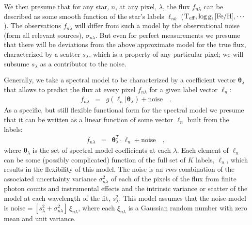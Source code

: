 \documentclass[12pt, preprint]{aastex}
\newcommand{\set}[1]{\bm{#1}}
\newcommand{\starlabel}{\ell}
\newcommand{\starlabelvec}{\set{\starlabel}}
\newcommand{\teff}{\mbox{$\rm T_{eff}$}}
\newcommand{\feh}{\mbox{$\rm [Fe/H]$}}
\newcommand{\logg}{\mbox{$\rm \log g$}}
\newcommand{\noise}{\sigma_{n\lambda}}
\newcommand{\scatter}{s_{\lambda}}
\begin{document}
We then presume that for any star, $n$, at any pixel, $\lambda$,
the flux $f_{n\lambda}$  can be described as some smooth function of the star's labels $\starlabel_{nk}$
($\teff,\logg,\feh,\cdots$).
The observations $f_{n\lambda}$ will differ from such a model by the observational noise (form all relevant sources), $\noise$. But even for perfect measurements we presume that there will be
deviations from the above approximate model for the true flux, characterized by a scatter $\scatter$,
which is a property of any particular pixel; we will subsume $\scatter$ as a contributor to the noise.

Generally, we take a spectral model to be characterized by a coefficient vector $\set{\theta}_\lambda$
that allows to predict the flux at every pixel $f_{n\lambda}$ for a given label vector 
$\starlabelvec_n$:
\begin{eqnarray}
f_{n\lambda} &=&
g(\starlabelvec_n |  \set{\theta}_\lambda) + \mbox{noise}
\label{eq:specmodel}\quad .
\end{eqnarray}
As a specific, but still flexible functional form for the spectral model we presume that it can be written as
a linear function of some vector $\starlabelvec_n$ built from the labels: 
\begin{eqnarray}
f_{n\lambda} &=&
\set{\theta}_\lambda^T \cdot \starlabelvec_n + \mbox{noise}
\label{eq:linearmodel}\quad ,
\end{eqnarray}
where $\set{\theta}_\lambda$ is the set of spectral model coefficients at each $\lambda$. Each element of $\starlabelvec_n$ can be some (possibly complicated) function of the full set of $K$ labels, $\starlabelvec_n$, which
results in the flexibility of this model. The noise is an \textit{rms} combination of the associated uncertainty variance
$\sigma_{n\lambda}^2$ of each of the pixels of the flux from finite photon counts and instrumental effects and the intrinsic variance or scatter of the model at each wavelength of the fit, $s_\lambda^2$.
This model assumes that the noise model is
$\mbox{noise} = [s_\lambda^2+ \sigma_{n\lambda}^2]\,\xi_{n\lambda}$,
where each $\xi_{n\lambda}$ is a Gaussian random number with zero mean and unit
variance.
\end{document}

